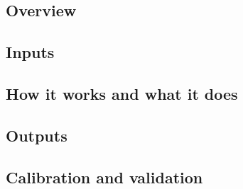 \subsection{Overview}
\subsection{Inputs}
\subsection{How it works and what it does}
\subsection{Outputs}
\subsection{Calibration and validation}